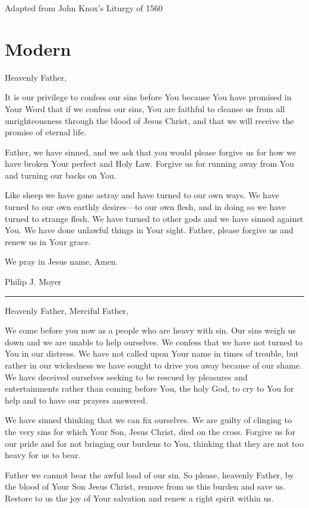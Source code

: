 \documentclass[]{book}
\begin{document}
Adapted from John Knox's Liturgy of 1560

\section{Modern}\label{modern}

Heavenly Father,

It is our privilege to confess our sins before You because You have
promised in Your Word that if we confess our sins, You are faithful to
cleanse us from all unrighteousness through the blood of Jesus Christ,
and that we will receive the promise of eternal life.

Father, we have sinned, and we ask that you would please forgive us for
how we have broken Your perfect and Holy Law. Forgive us for running
away from You and turning our backs on You.

Like sheep we have gone astray and have turned to our own ways. We have
turned to our own earthly desires---to our own flesh, and in doing so we
have turned to strange flesh. We have turned to other gods and we have
sinned against You. We have done unlawful things in Your sight. Father,
please forgive us and renew us in Your grace.

We pray in Jesus name, Amen.

Philip J. Moyer

\begin{center}\rule{0.5\linewidth}{\linethickness}\end{center}

Heavenly Father, Merciful Father,

We come before you now as a people who are heavy with sin. Our sins
weigh us down and we are unable to help ourselves. We confess that we
have not turned to You in our distress. We have not called upon Your
name in times of trouble, but rather in our wickedness we have sought to
drive you away because of our shame. We have deceived ourselves seeking
to be rescued by pleasures and entertainments rather than coming before
You, the holy God, to cry to You for help and to have our prayers
answered.

We have sinned thinking that we can fix ourselves. We are guilty of
clinging to the very sins for which Your Son, Jesus Christ, died on the
cross. Forgive us for our pride and for not bringing our burdens to You,
thinking that they are not too heavy for us to bear.

Father we cannot bear the awful load of our sin. So please, heavenly
Father, by the blood of Your Son Jesus Christ, remove from us this
burden and save us. Restore to us the joy of Your salvation and renew a
right spirit within us.
\end{document}
